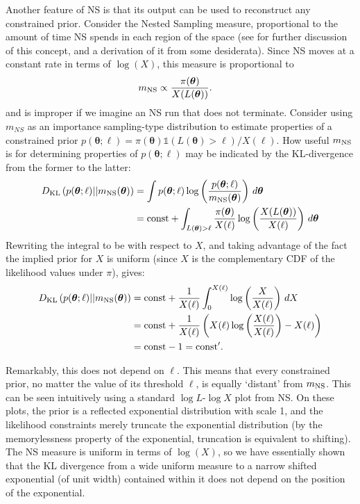 \documentclass[entropy,article,submit,moreauthors,pdftex,10pt,a4paper]{Definitions/mdpi}
\newcommand{\xx}{\boldsymbol{\theta}}
\begin{document}
Another feature of NS is that its output can be used to reconstruct
any constrained prior. Consider the Nested Sampling measure, proportional
to the amount of time
NS spends in each region of the space (see \citet{polson2014vertical}
for further discussion of this concept, and a derivation of it from some
desiderata).
Since NS moves at a constant rate
in terms of $\log(X)$, this measure is proportional to
\begin{align}
m_{\rm NS} &\propto \frac{\pi(\xx)}{X(L(\xx))}.\label{eqn:measure}
\end{align}
and is improper if we imagine an NS run that does not terminate.
Consider using $m_{NS}$ as an importance sampling-type distribution to
estimate properties of a constrained prior
$p(\xx ; \ell) = \pi(\xx)\mathds{1}(L(\xx) > \ell)/X(\ell)$.
How useful $m_{\rm NS}$ is for determining properties of $p(\xx ; \ell)$
may be indicated by the KL-divergence from the former to the latter:
\begin{align}
D_{\rm KL}\left(p(\xx ; \ell) || m_{\rm NS}(\xx)\right)
    &= \int p(\xx ; \ell)
                \log \left(\frac{p(\xx ; \ell)}{m_{\rm NS}(\xx)}\right)
                \, d\xx \\
    &= \textnormal{const} + \int_{L(\xx) > \ell} \frac{\pi(\xx)}{X(\ell)}
                \log \left(\frac{X(L(\xx))}{X(\ell)}\right) \, d\xx
\end{align}
Rewriting the integral to be with respect to $X$,
and taking advantage of the
fact the implied prior for $X$ is uniform (since $X$ is the complementary
CDF of the likelihood values under $\pi$), gives:
\begin{align}
D_{\rm KL}\left(p(\xx ; \ell) || m_{\rm NS}(\xx)\right)
    &= \textnormal{const} + \frac{1}{X(\ell)}\int_0^{X(\ell)} 
                \log \left(\frac{X}{X(\ell)}\right) \, dX\\
    &= \textnormal{const} + \frac{1}{X(\ell)}\left(
                    X(\ell)\log \left(\frac{X(\ell)}{X(\ell)}\right) - X(\ell)\right)\\
    &= \textnormal{const} -1 = \textnormal{const}'.
\end{align}

Remarkably, this does not depend on $\ell$. This means that every constrained
prior, no matter the value of its threshold $\ell$, is equally `distant'
from $m_{\rm NS}$. This can be seen intuitively using a standard
$\log L$-$\log X$ plot from NS. On these plots, the prior is a reflected
exponential distribution with scale 1, and the likelihood constraints
merely truncate the exponential distribution (by the memorylessness property
of the exponential, truncation is equivalent to shifting). The NS measure
is uniform in terms of $\log(X)$, so we have essentially shown that the KL
divergence from a wide uniform measure to a narrow shifted
exponential (of unit width) contained within it does not depend on the
position of the exponential.
\end{document}
